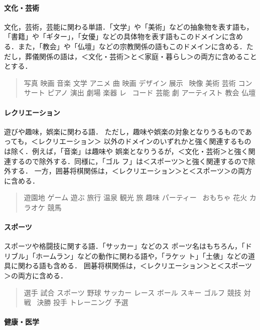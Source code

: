 \documentclass[a4j,titlepage]{jarticle}
\begin{document}
\paragraph{文化・芸術}

文化，芸術，芸能に関わる単語．「文学」や「美術」などの抽象物を表す語も，
「書籍」や「ギター」，「女優」などの具体物を表す語もこのドメインに含め
る．また，「教会」や「仏壇」などの宗教関係の語もこのドメインに含める．た
だし，葬儀関係の語は，＜文化・芸術＞と＜家庭・暮らし＞の両方に含めること
とする．

\begin{quote}
写真 映画 音楽 文学 アニメ 曲 映画 デザイン 展示 
\ 映像 美術 芸術 コンサート ピアノ 演出 劇場 楽器 レ
\ コード 芸能 劇 アーティスト 教会 仏壇
\end{quote}


\paragraph{レクリエーション}

遊びや趣味，娯楽に関わる語．
ただし，趣味や娯楽の対象となりうるものであっても，＜レクリエーション＞
以外のドメインのいずれかと強く関連するものは除く．例えば，「音楽」は趣味や
娯楽となりうるが，＜文化・芸術＞と強く関連するので除外する．同様に，「ゴル
フ」は＜スポーツ＞と強く関連するので除外する．
一方，囲碁将棋関係は，＜レクリエーション＞と＜スポーツ＞の両方に含める．

\begin{quote}
遊園地 ゲーム 遊ぶ 旅行 温泉 観光 旅 趣味 パーティー 
\ おもちゃ 花火 カラオケ 競馬
\end{quote}


\paragraph{スポーツ}

スポーツや格闘技に関する語．「サッカー」などのス
ポーツ名はもちろん，「ドリブル」「ホームラン」などの動作に関わる語や，「ラケッ
ト」「土俵」などの道具に関わる語も含める．
囲碁将棋関係は，＜レクリエーション＞と＜スポーツ＞の両方に含める．

\begin{quote}
選手 試合 スポーツ 野球 サッカー レース ボール スキー ゴルフ 競技 対戦 
\ 決勝 投手 トレーニング 予選
\end{quote}


\paragraph{健康・医学}
\end{document}
